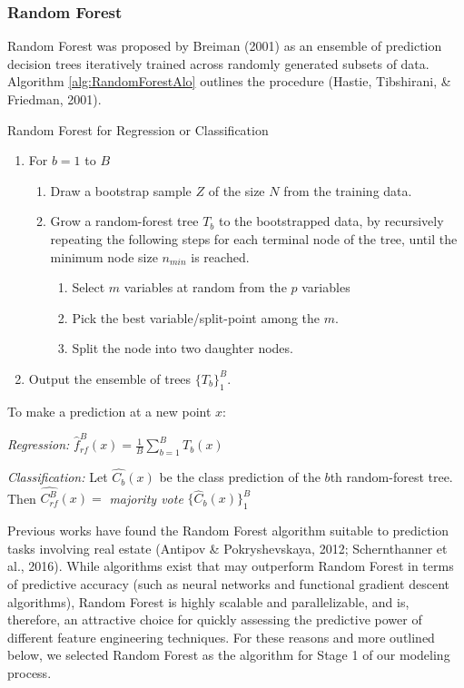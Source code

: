 \documentclass[conference,final,]{IEEEtran}
\begin{document}
\hypertarget{random-forest}{%
\subsubsection{Random Forest}\label{random-forest}}

Random Forest was proposed by Breiman (2001) as an ensemble of
prediction decision trees iteratively trained across randomly generated
subsets of data. Algorithm \ref{alg:RandomForestAlo} outlines the
procedure (Hastie, Tibshirani, \& Friedman, 2001).

\begin{algorithm}
\caption{Random Forest for Regression or Classification}\label{alg:RandomForestAlo}

\begin{enumerate}
\item For $b = 1$ to $B$
\begin{enumerate}
\item Draw a bootstrap sample $Z$ of the size $N$ from the training data.
\item Grow a random-forest tree $T_b$ to the bootstrapped data, by recursively repeating the following steps for each terminal node of the tree, until the minimum node size $n_{min}$ is reached.
\begin{enumerate}
\item Select $m$ variables at random from the $p$ variables
\item Pick the best variable/split-point among the $m$.
\item Split the node into two daughter nodes.
\end{enumerate}
\end{enumerate}
\item Output the ensemble of trees $\{T_b\}_1^B$.
\end{enumerate}

To make a prediction at a new point $x$:

\textit{Regression:} $\hat{f}_{rf}^B(x) = \frac{1}{B}\sum_{b=1}^{B}T_b(x)$

\textit{Classification:} Let $\hat{C_b}(x)$ be the class prediction of the $b$th random-forest tree. Then $\hat{C_{rf}^B}(x)=$ \textit{majority vote} $\{\hat{C}_{b}(x)\}_1^B $

\end{algorithm}

Previous works have found the Random Forest algorithm suitable to
prediction tasks involving real estate (Antipov \& Pokryshevskaya, 2012;
Schernthanner et al., 2016). While algorithms exist that may outperform
Random Forest in terms of predictive accuracy (such as neural networks
and functional gradient descent algorithms), Random Forest is highly
scalable and parallelizable, and is, therefore, an attractive choice for
quickly assessing the predictive power of different feature engineering
techniques. For these reasons and more outlined below, we selected
Random Forest as the algorithm for Stage 1 of our modeling process.
\end{document}
